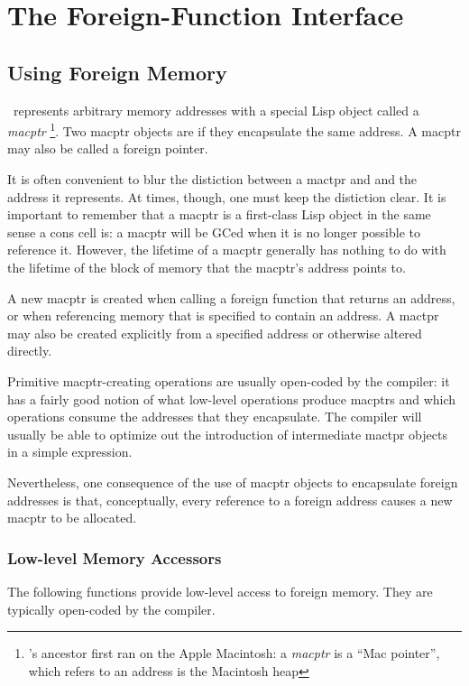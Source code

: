 \chapter{The Foreign-Function Interface}

\section{Using Foreign Memory}

\CCL\ represents arbitrary memory addresses with a special Lisp object
called a {\it macptr}
\footnote{\CCL's ancestor first ran on the Apple Macintosh: a {\it
    macptr} is a ``Mac pointer'', which refers to an address is the
  Macintosh heap}.
Two macptr objects are  if they
encapsulate the same address.  A macptr may also be called a foreign
pointer.

It is often convenient to blur the distiction between a mactpr and and
the address it represents.  At times, though, one must keep the
distiction clear.  It is important to remember that a macptr is a
first-class Lisp object in the same sense a cons cell is: a macptr
will be GCed when it is no longer possible to reference it.  However,
the lifetime of a macptr generally has nothing to do with the lifetime
of the block of memory that the macptr's address points to.

A new macptr is created when calling a foreign function that returns
an address, or when referencing memory that is specified to contain an
address.  A mactpr may also be created explicitly from a specified
address or otherwise altered directly.

Primitive macptr-creating operations are usually open-coded by the
compiler: it has a fairly good notion of what low-level operations
produce macptrs and which operations consume the addresses that they
encapsulate.  The compiler will usually be able to optimize out the
introduction of intermediate mactpr objects in a simple expression.

Nevertheless, one consequence of the use of macptr objects to
encapsulate foreign addresses is that, conceptually, every reference
to a foreign address causes a new macptr to be allocated.

\subsection{Low-level Memory Accessors}

The following functions provide low-level access to foreign memory.
They are typically open-coded by the compiler.

